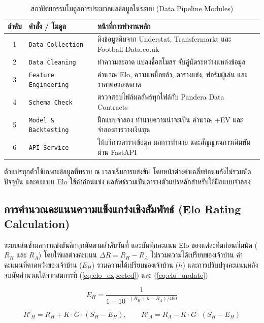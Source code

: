 \begin{table}[htbp]
\centering
\caption{สถาปัตยกรรมโมดูลการประมวลผลข้อมูลในระบบ (Data Pipeline Modules)}
\label{tab:pipeline_architecture}
\small
\begin{tabular}{|c|l|>{\raggedright\arraybackslash}p{7.2cm}|}
\hline
\textbf{ลำดับ} & \textbf{คำสั่ง / โมดูล} & \textbf{หน้าที่การทำงานหลัก} \\
\hline
1 & \texttt{Data Collection} & ดึงข้อมูลดิบจาก Understat, Transfermarkt และ Football-Data.co.uk \\ \hline
2 & \texttt{Data Cleaning} & ทำความสะอาด แปลงชื่อสโมสร จับคู่นัดระหว่างแหล่งข้อมูล \\ \hline
3 & \texttt{Feature Engineering} & คำนวณ Elo, ความเหนื่อยล้า, ตารางแข่ง, ฟอร์มผู้เล่น และราคาต่อรองตลาด \\ \hline
4 & \texttt{Schema Check} & ตรวจสอบไฟล์ผลลัพธ์ทุกไฟล์กับ Pandera Data Contracts \\ \hline
5 & \texttt{Model \& Backtesting} & ฝึกแบบจำลอง ทำนายความน่าจะเป็น คำนวณ +EV และจำลองการวางเงินทุน \\ \hline
6 & \texttt{API Service} & ให้บริการตารางข้อมูล ผลการทำนาย และสัญญาณการเดิมพันผ่าน FastAPI \\
\hline
\end{tabular}
\end{table}

ตัวแปรทุกตัวใช้เฉพาะข้อมูลที่ทราบ ณ เวลาเริ่มการแข่งขัน โดยหน้าต่างค่าเฉลี่ยย้อนหลังไม่รวมนัดปัจจุบัน และคะแนน Elo ใช้ค่าก่อนแข่ง ผลลัพธ์รวมเป็นตารางตัวแปรหลักสำหรับใช้ฝึกแบบจำลอง

\subsection{การคำนวณคะแนนความแข็งแกร่งเชิงสัมพัทธ์ (Elo Rating Calculation)}
ระบบเล่นซ้ำผลการแข่งขันลีกทุกนัดตามลำดับวันที่ และบันทึกคะแนน Elo ของแต่ละทีมก่อนเริ่มนัด ($R_H$ และ $R_A$) โดยให้ผลต่างคะแนน $\Delta R = R_H - R_A$ ไม่รวมความได้เปรียบของเจ้าบ้าน ค่าคะแนนที่คาดหวังของเจ้าบ้าน ($E_H$) รวมความได้เปรียบของเจ้าบ้าน ($h$) และการปรับปรุงคะแนนหลังจบนัดคำนวณได้จากสมการที่ (\ref{eq:elo_expected}) และ (\ref{eq:elo_update})

\begin{equation}
    E_H = \frac{1}{1 + 10^{-(R_H + h - R_A)/400}}
    \label{eq:elo_expected}
\end{equation}

\begin{equation}
    R'_H = R_H + K \cdot G \cdot (S_H - E_H), \qquad R'_A = R_A - K \cdot G \cdot (S_H - E_H)
    \label{eq:elo_update}
\end{equation}

